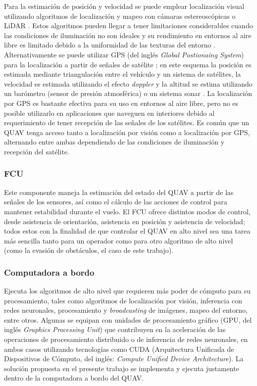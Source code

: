 Para la estimación de posición y velocidad se puede emplear localización visual utilizando algoritmos de localización y mapeo con cámaras estereoscópicas o LiDAR \cite{multidrone2017review}. Estos algoritmos pueden llegar a tener limitaciones considerables cuando las condiciones de iluminación no son ideales y su rendimiento en entornos al aire libre es limitado debido a la uniformidad de las texturas del entorno \cite{multidrone2017review}. Alternativamente se puede utilizar GPS (del inglés \textit{Global Postionaing System}) para la localización a partir de señales de satélite \cite{multidrone2017review}; en este esquema la posición es estimada mediante triangulación entre el vehículo y un sistema de satélites, la velocidad es estimada utilizando el efecto \textit{doppler} y la altitud se estima utilizando un barómetro (sensor de presión atmosférica) o un sistema sonar \cite{multidrone2017review}. La localización por GPS es bastante efectiva para su uso en entornos al aire libre, pero no es posible utilizarlo en aplicaciones que naveguen en interiores debido al requerimiento de tener recepción de las señales de los satélites. Es común que un QUAV tenga acceso tanto a localización por visión como a localización por GPS, alternando entre ambas dependiendo de las condiciones de iluminación y recepción del satélite.

\subsubsection{FCU}
\label{sec:QUAV-FCU}

Este componente maneja la estimación del estado del QUAV a partir de las señales de los sensores, así como el cálculo de las acciones de control para mantener estabilidad durante el vuelo. El FCU ofrece distintos modos de control, desde asistencia de orientación, asistencia en posición y asistencia de velocidad; todos estos con la finalidad de que controlar el QUAV en alto nivel sea una tarea más sencilla tanto para un operador como para otro algoritmo de alto nivel (como la evasión de obstáculos, el caso de este trabajo). 

\subsubsection{Computadora a bordo}

Ejecuta los algoritmos de alto nivel que requieren más poder de cómputo para su procesamiento, tales como algoritmos de localización por visión, inferencia con redes neuronales, procesamiento y \textit{broadcasting} de imágenes, mapeo del entorno, entre otros. Algunas se equipan con unidades de procesamiento gráfico (GPU, del inglés \textit{Graphics Processing Unit}) que contribuyen en la aceleración de las operaciones de procesamiento distribuido o de inferencia de redes neuronales, en ambos casos utilizando tecnologías como CUDA (Arquitectura Unificada de Dispositivos de Cómputo, del inglés: \textit{Compute Unified Device Architecture}). La solución propuesta en el presente trabajo se implementa y ejecuta justamente dentro de la computadora a bordo del QUAV.

